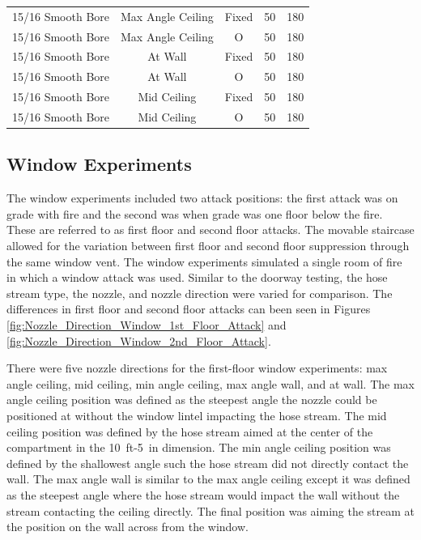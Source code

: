 \documentclass[12pt,oneside]{book}
\begin{document}
\begin{table}[!ht]
\begin{tabular}{ccccc}
15/16 Smooth Bore & Max Angle Ceiling   & Fixed   & 50 & 180 \\
15/16 Smooth Bore & Max Angle Ceiling   & O & 50  & 180 \\
15/16 Smooth Bore & At Wall     		& Fixed   & 50 & 180 \\
15/16 Smooth Bore & At Wall     		& O & 50  & 180 \\
15/16 Smooth Bore & Mid Ceiling 		& Fixed   & 50 & 180 \\
15/16 Smooth Bore & Mid Ceiling 		& O & 50  & 180 \\
\bottomrule[1.25pt]
\end{tabular}
\end{table}

\clearpage

\subsection{Window Experiments}
\label{ext_tests}

The window experiments included two attack positions: the first attack was on grade with fire and the second was when grade was one floor below the fire. These are referred to as first floor and second floor attacks. The movable staircase allowed for the variation between first floor and second floor suppression through the same window vent. The window experiments simulated a single room of fire in which a window attack was used. Similar to the doorway testing, the hose stream type, the nozzle, and nozzle direction were varied for comparison. The differences in first floor and second floor attacks can been seen in Figures \ref{fig:Nozzle_Direction_Window_1st_Floor_Attack} and \ref{fig:Nozzle_Direction_Window_2nd_Floor_Attack}. 

There were five nozzle directions for the first-floor window experiments: max angle ceiling, mid ceiling, min angle ceiling, max angle wall, and at wall. The max angle ceiling position was defined as the steepest angle the nozzle could be positioned at without the window lintel impacting the hose stream. The mid ceiling position was defined by the hose stream aimed at the center of the compartment in the 10~ft-5~in dimension. The min angle ceiling position was defined by the shallowest angle such the hose stream did not directly contact the wall. The max angle wall is similar to the max angle ceiling except it was defined as the steepest angle where the hose stream would impact the wall without the stream contacting the ceiling directly. The final position was aiming the stream at the position on the wall across from the window.
\end{document}
